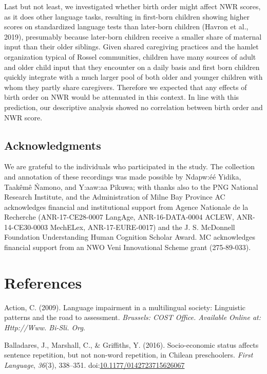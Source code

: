 \documentclass[english,,man,floatsintext]{apa6}
\begin{document}
Last but not least, we investigated whether birth order might affect NWR
scores, as it does other language tasks, resulting in first-born
children showing higher scores on standardized language tests than
later-born children (Havron et al., 2019), presumably because later-born
children receive a smaller share of maternal input than their older
siblings. Given shared caregiving practices and the hamlet organization
typical of Rossel communities, children have many sources of adult and
older child input that they encounter on a daily basis and first born
children quickly integrate with a much larger pool of both older and
younger children with whom they partly share caregivers. Therefore we
expected that any effects of birth order on NWR would be attenuated in
this context. In line with this prediction, our descriptive analysis
showed no correlation between birth order and NWR score.

\newpage

\subsection{Acknowledgments}\label{acknowledgments}

We are grateful to the individuals who participated in the study. The
collection and annotation of these recordings was made possible by
Ndapw:éé Yidika, Taakêmê Ńamono, and Y:aaw:aa Pikuwa; with thanks also
to the PNG National Research Institute, and the Administration of Milne
Bay Province AC acknowledges financial and institutional support from
Agence Nationale de la Recherche (ANR-17-CE28-0007 LangAge,
ANR-16-DATA-0004 ACLEW, ANR-14-CE30-0003 MechELex, ANR-17-EURE-0017) and
the J. S. McDonnell Foundation Understanding Human Cognition Scholar
Award. MC acknowledges financial support from an NWO Veni Innovational
Scheme grant (275-89-033).

\section{References}\label{references}

\setlength{\parindent}{-0.5in} \setlength{\leftskip}{0.5in}

\hypertarget{refs}{}
\hypertarget{ref-is08042009language}{}
Action, C. (2009). Language impairment in a multilingual society:
Linguistic patterns and the road to assessment. \emph{Brussels: COST
Office. Available Online at: Http://Www. Bi-Sli. Org}.

\hypertarget{ref-balladares2016socio}{}
Balladares, J., Marshall, C., \& Griffiths, Y. (2016). Socio-economic
status affects sentence repetition, but not non-word repetition, in
Chilean preschoolers. \emph{First Language}, \emph{36}(3), 338--351.
doi:\href{https://doi.org/10.1177/0142723715626067}{10.1177/0142723715626067}
\end{document}
